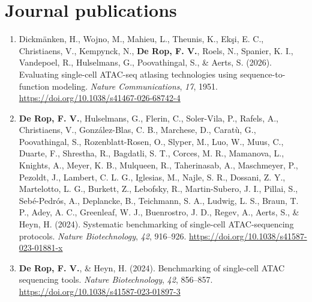 \begingroup
{}
\setlength{\parindent}{0pt}
\setlength{\parskip}{0.5\baselineskip}
\setlength{\emergencystretch}{2em}

\section*{Journal publications}

\begin{enumerate}[leftmargin=*,itemsep=0.5\baselineskip]
\item Dickm\"anken, H., Wojno, M., Mahieu, L., Theunis, K., Ek\c{s}i, E. C., Christiaens, V., Kempynck, N., \textbf{De Rop, F. V.}, Roels, N., Spanier, K. I., Vandepoel, R., Hulselmans, G., Poovathingal, S., \& Aerts, S. (2026). Evaluating single-cell ATAC-seq atlasing technologies using sequence-to-function modeling. \emph{Nature Communications}, \emph{17}, 1951. \href{https://doi.org/10.1038/s41467-026-68742-4}{https://doi.org/10.1038/s41467-026-68742-4}

\item \textbf{De Rop, F. V.}, Hulselmans, G., Flerin, C., Soler-Vila, P., Rafels, A., Christiaens, V., Gonz\'alez-Blas, C. B., Marchese, D., Carat\`u, G., Poovathingal, S., Rozenblatt-Rosen, O., Slyper, M., Luo, W., Muus, C., Duarte, F., Shrestha, R., Bagdatli, S. T., Corces, M. R., Mamanova, L., Knights, A., Meyer, K. B., Mulqueen, R., Taherinasab, A., Maschmeyer, P., Pezoldt, J., Lambert, C. L. G., Iglesias, M., Najle, S. R., Dossani, Z. Y., Martelotto, L. G., Burkett, Z., Lebofsky, R., Martin-Subero, J. I., Pillai, S., Seb\'e-Pedr\'os, A., Deplancke, B., Teichmann, S. A., Ludwig, L. S., Braun, T. P., Adey, A. C., Greenleaf, W. J., Buenrostro, J. D., Regev, A., Aerts, S., \& Heyn, H. (2024). Systematic benchmarking of single-cell ATAC-sequencing protocols. \emph{Nature Biotechnology}, \emph{42}, 916--926. \href{https://doi.org/10.1038/s41587-023-01881-x}{https://doi.org/10.1038/s41587-023-01881-x}

\item \textbf{De Rop, F. V.}, \& Heyn, H. (2024). Benchmarking of single-cell ATAC sequencing tools. \emph{Nature Biotechnology}, \emph{42}, 856--857. \href{https://doi.org/10.1038/s41587-023-01897-3}{https://doi.org/10.1038/s41587-023-01897-3}


\end{enumerate}
